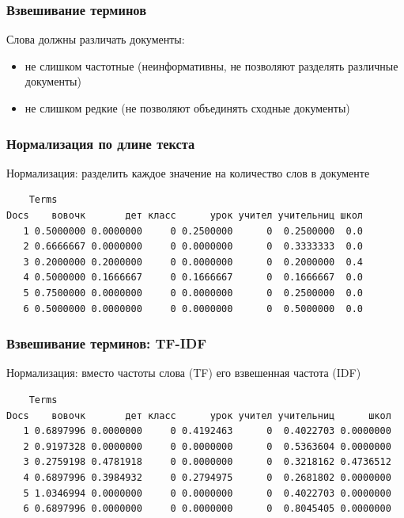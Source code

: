 \documentclass[svgnames]{beamer}
\begin{document}
\begin{frame}
  \frametitle{Взвешивание терминов}
  Слова должны \alert{различать} документы:
  \begin{itemize}
  \item не слишком частотные (неинформативны, не позволяют разделять
    различные документы)
  \item не слишком редкие (не позволяют объединять сходные документы)
  \end{itemize}
\end{frame}

\begin{frame}[fragile]
  \frametitle{Нормализация по длине текста}
  Нормализация: разделить каждое значение на количество слов в документе
  \footnotesize
\begin{verbatim}
    Terms
Docs    вовочк       дет класс      урок учител учительниц школ
   1 0.5000000 0.0000000     0 0.2500000      0  0.2500000  0.0
   2 0.6666667 0.0000000     0 0.0000000      0  0.3333333  0.0
   3 0.2000000 0.2000000     0 0.0000000      0  0.2000000  0.4
   4 0.5000000 0.1666667     0 0.1666667      0  0.1666667  0.0
   5 0.7500000 0.0000000     0 0.0000000      0  0.2500000  0.0
   6 0.5000000 0.0000000     0 0.0000000      0  0.5000000  0.0
\end{verbatim}
\end{frame}

\begin{frame}[fragile]
  \frametitle{Взвешивание терминов: TF-IDF}
  Нормализация: вместо частоты слова (TF) его взвешенная частота (IDF)
  \footnotesize
\begin{verbatim}
    Terms
Docs    вовочк       дет класс      урок учител учительниц      школ
   1 0.6897996 0.0000000     0 0.4192463      0  0.4022703 0.0000000
   2 0.9197328 0.0000000     0 0.0000000      0  0.5363604 0.0000000
   3 0.2759198 0.4781918     0 0.0000000      0  0.3218162 0.4736512
   4 0.6897996 0.3984932     0 0.2794975      0  0.2681802 0.0000000
   5 1.0346994 0.0000000     0 0.0000000      0  0.4022703 0.0000000
   6 0.6897996 0.0000000     0 0.0000000      0  0.8045405 0.0000000
\end{verbatim}
\end{frame}
\end{document}
